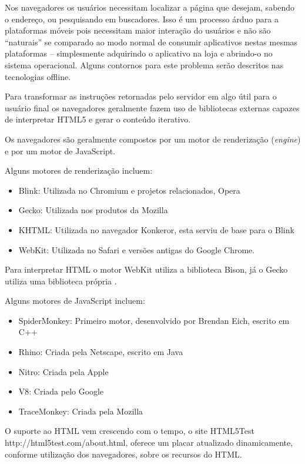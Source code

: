 Nos navegadores os usuários necessitam localizar a página que desejam,
sabendo o endereço, ou pesquisando em buscadores. Isso é um processo
árduo para a plataformas móveis pois necessitam maior interação
do usuários e não são “naturais” se comparado ao modo normal
de consumir aplicativos nestas mesmas plataformas – simplesmente
adquirindo o aplicativo na loja e abrindo-o no sistema operacional.
Alguns contornos para este problema serão descritos nas tecnologias
offline.

Para transformar as instruções retornadas pelo servidor em algo útil
para o usuário final os navegadores geralmente fazem uso de bibliotecas
externas capazes de interpretar HTML5 e gerar o conteúdo iterativo.

Os navegadores são geralmente compostos por um motor de renderização
(\textit{engine}) e por um motor de JavaScript.

Alguns motores de renderização incluem:

\begin{itemize}
    \item Blink: Utilizada no Chromium e projetos relacionados, Opera
    \item Gecko: Utilizada nos produtos da Mozilla
    \item KHTML: Utilizada no navegador Konkeror, esta serviu de base para o Blink
    \item WebKit: Utilizada no Safari e versões antigas do Google Chrome.
\end{itemize}

Para interpretar HTML o motor WebKit utiliza a biblioteca Bison, já o Gecko utiliza uma biblioteca própria \autocite{howBrowsersWork}.

Alguns motores de JavaScript incluem:

\begin{itemize}
    \item SpiderMonkey: Primeiro motor, desenvolvido por Brendan Eich, escrito em C++
    \item Rhino: Criada pela Netscape, escrito em Java
    \item Nitro: Criada pela Apple
    \item V8: Criada pelo Google
    \item TraceMonkey: Criada pela Mozilla
\end{itemize}

O suporte ao HTML vem crescendo com o tempo, o site HTML5Test
http://html5test.com/about.html, oferece um placar atualizado
dinamicamente, conforme utilização dos navegadores, sobre os recursos
do HTML.

